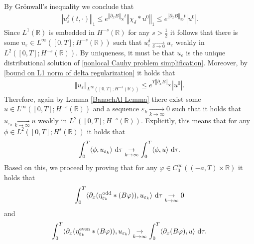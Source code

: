 \documentclass[11pt,reqno]{amsart}
\numberwithin{equation}{section}
\def\dd{{\rm d}}
\begin{document}
By Gr\"onwall's inequality we conclude that 
\begin{align}
\left\Vert u_{\varepsilon}^{\delta}(t,\cdot)\right\Vert_{1}\leq e^{\left\Vert \partial_{x}B\right\Vert_{\infty}t}\left\Vert \chi_{\delta}\ast u^{0}\right\Vert_{1}\leq e^{\left\Vert \partial_{x}B\right\Vert_{\infty}t}\left\vert u^{0}\right\vert. \label{bound on L1 norm of delta regularization}      
\end{align}
Since $L^{1}(\mathbb{R})$ is embedded in $H^{-s}(\mathbb{R})$ for any $s>\frac{1}{2}$ it follows that there is some $u_{\varepsilon}\in L^{\infty}([0,T];H^{-s}(\mathbb{R}))$ such that $u_{\varepsilon}^{\delta}\underset{\delta \rightarrow 0}{\rightharpoonup}u_{\varepsilon}$ weakly in $L^{2}([0,T];H^{-s}(\mathbb{R}))$. 
By uniqueness, it must be that $u_{\varepsilon}$ is the unique distributional solution of \eqref{nonlocal Cauhy problem simplification}. Moreover, by \eqref{bound on L1 norm of delta regularization} it holds that 
\begin{align*}
\left\Vert u_{\varepsilon}\right\Vert_{L^{\infty}([0,T];H^{-s}(\mathbb{R}))}\leq e^{T\left\Vert \partial_{x}B\right\Vert_{\infty}}\left\vert u^{0}\right\vert.      
\end{align*}
Therefore, again by Lemma \ref{BanachAl Lemma} there exist some $u\in L^{\infty}([0,T];H^{-s}(\mathbb{R}))$ and a sequence $\varepsilon_{k}\underset{k\rightarrow \infty}{\rightarrow} 0$ such that it holds that $u_{\varepsilon_{k}}\underset{k\rightarrow \infty}{\rightharpoonup} u$ weakly in $L^{2}([0,T];H^{-s}(\mathbb{R}))$. Explicitly, this means that for any $\phi\in L^{2}([0,T];H^{s}(\mathbb{R}))$ it holds that 
\begin{align*}
\int_{0}^{T} \langle \phi,u_{\varepsilon_{k}}\rangle\ \dd \tau  \underset{k\rightarrow \infty}{\rightarrow} \int_{0}^{T}\langle \phi,u\rangle\ \dd \tau.  
\end{align*}
Based on this, we proceed by proving that for any $\varphi \in C^{\infty}_{0}(
(-a,T)\times \mathbb{R})$ it holds that 
\begin{align*}
\int_{0}^{T}\langle  \partial_{x}(\eta^{\mathrm{odd}}_{\varepsilon_{k}}\ast(B\varphi)),u_{\varepsilon_{k}}\rangle \ \dd \tau\underset{k \rightarrow \infty}{\rightarrow} 0    
\end{align*}
and 
\begin{align*}
\int_{0}^{T}\langle  \partial_{x}(\eta_{\varepsilon_{k}}^{\mathrm{even}}\ast (B\varphi)), u_{\varepsilon_{k}}\rangle \underset{k\rightarrow \infty}{\rightarrow}\int_{0}^{T}\langle \partial_{x}(B\varphi),u\rangle \ \dd \tau.     
\end{align*}
\end{document}
